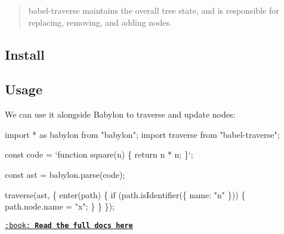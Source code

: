 \begin{quote}
babel-\/traverse maintains the overall tree state, and is responsible for replacing, removing, and adding nodes. \end{quote}


\subsection*{Install}




\subsection*{Usage}

We can use it alongside Babylon to traverse and update nodes\+:


\begin{DoxyCode}
import * as babylon from "babylon";
import traverse from "babel-traverse";

const code = `function square(n) \{
  return n * n;
\}`;

const ast = babylon.parse(code);

traverse(ast, \{
  enter(path) \{
    if (path.isIdentifier(\{ name: "n" \})) \{
      path.node.name = "x";
    \}
  \}
\});
\end{DoxyCode}
 \href{https://github.com/thejameskyle/babel-handbook/blob/master/translations/en/plugin-handbook.md#babel-traverse}{\tt \+:book\+: {\bfseries Read the full docs here}} 